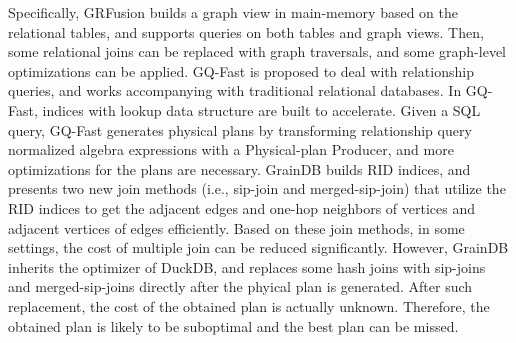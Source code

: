 Specifically, GRFusion \cite{GRFusion} builds a graph view in main-memory based on the relational tables, and supports queries on both tables and graph views.
Then, some relational joins can be replaced with graph traversals, and some graph-level optimizations can be applied.
GQ-Fast \cite{gqfast} is proposed to deal with relationship queries, and works accompanying with traditional relational databases.
In GQ-Fast, indices with lookup data structure are built to accelerate.
Given a SQL query, GQ-Fast generates physical plans by transforming relationship query normalized algebra expressions with a Physical-plan Producer, and more optimizations for the plans are necessary.
GrainDB \cite{graindb} builds RID indices, and presents two new join methods (i.e., sip-join and merged-sip-join) that utilize the RID indices to get the adjacent edges and one-hop neighbors of vertices and adjacent vertices of edges efficiently. 
Based on these join methods, in some settings, the cost of multiple join can be reduced significantly.
However, GrainDB inherits the optimizer of DuckDB, and replaces some hash joins with sip-joins and merged-sip-joins directly after the phyical plan is generated.
After such replacement, the cost of the obtained plan is actually unknown.
Therefore, the obtained plan is likely to be suboptimal and the best plan can be missed.
